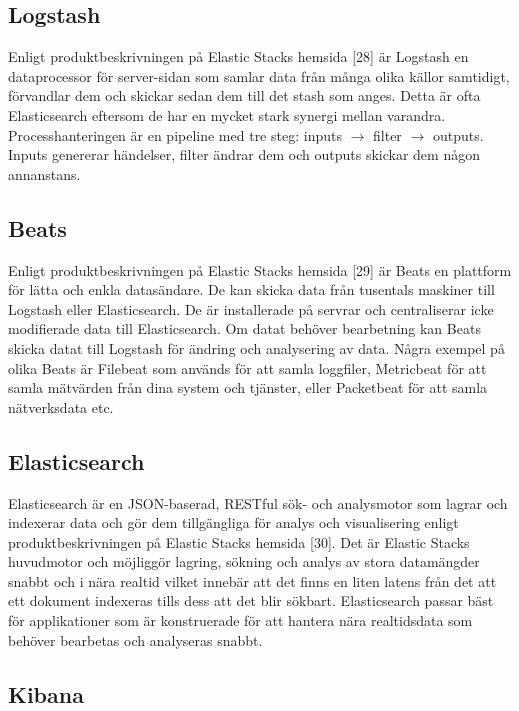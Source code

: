 \documentclass[12pt]{kththesis}
\begin{document}
\subsection{Logstash}

Enligt produktbeskrivningen på Elastic Stacks hemsida [28] är Logstash en dataprocessor för server-sidan som samlar data från många olika källor samtidigt, förvandlar dem och skickar sedan dem till det stash som anges. Detta är ofta Elasticsearch eftersom de har en mycket stark synergi mellan varandra. Processhanteringen är en pipeline med tre steg: inputs $\rightarrow$ filter $\rightarrow$ outputs. Inputs genererar händelser, filter ändrar dem och outputs skickar dem någon annanstans. 

\subsection{Beats}

Enligt produktbeskrivningen på Elastic Stacks hemsida [29] är Beats en plattform för lätta och enkla datasändare. De kan skicka data från tusentals maskiner till Logstash eller Elasticsearch. De är installerade på servrar och centraliserar icke modifierade data till Elasticsearch. Om datat behöver bearbetning kan Beats skicka datat till Logstash för ändring och analysering av data. Några exempel på olika Beats är Filebeat som används för att samla loggfiler, Metricbeat för att samla mätvärden från dina system och tjänster, eller Packetbeat för att samla nätverksdata etc. 

\subsection{Elasticsearch}

Elasticsearch är en JSON-baserad, RESTful sök- och analysmotor som lagrar och indexerar data och gör dem tillgängliga för analys och visualisering enligt produktbeskrivningen på Elastic Stacks hemsida [30]. Det är Elastic Stacks huvudmotor och möjliggör lagring, sökning och analys av stora datamängder snabbt och i nära realtid vilket innebär att det finns en liten latens från det att ett dokument indexeras tills dess att det blir sökbart. Elasticsearch passar bäst för applikationer som är konstruerade för att hantera nära realtidsdata som behöver bearbetas och analyseras snabbt. 

\subsection{Kibana}
\end{document}

